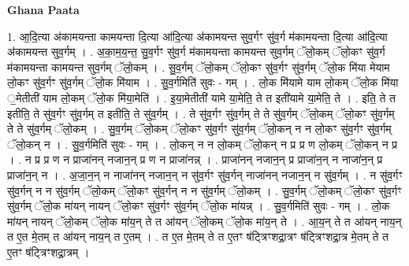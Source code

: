 \documentclass[17pt]{extarticle}
\begin{document}
\textbf{Ghana Paata } \newline

1. आ॒दि॒त्या अ॑कामयन्ता कामयन्ता दि॒त्या आ॑दि॒त्या अ॑कामयन्त सुव॒र्गꣳ सु॑व॒र्ग म॑कामयन्ता दि॒त्या आ॑दि॒त्या अ॑कामयन्त सुव॒र्गम् । . अ॒का॒म॒य॒न्त॒ सु॒व॒र्गꣳ सु॑व॒र्ग म॑कामयन्ता कामयन्त सुव॒र्गम् ॅलो॒कम् ॅलो॒कꣳ सु॑व॒र्ग म॑कामयन्ता कामयन्त सुव॒र्गम् ॅलो॒कम् । . सु॒व॒र्गम् ॅलो॒कम् ॅलो॒कꣳ सु॑व॒र्गꣳ सु॑व॒र्गम् ॅलो॒क मि॑या मेयाम लो॒कꣳ सु॑व॒र्गꣳ सु॑व॒र्गम् ॅलो॒क मि॑याम । . सु॒व॒र्गमिति॑ सुवः - गम् । . लो॒क मि॑यामे याम लो॒कम् ॅलो॒क मि॑या ॒मेतीती॑ याम लो॒कम् ॅलो॒क मि॑या॒मेति॑ । . इ॒या॒मेतीती॑ यामे या॒मेति॒ ते त इती॑यामे या॒मेति॒ ते । . इति॒ ते त इतीति॒ ते सु॑व॒र्गꣳ सु॑व॒र्गम् त इतीति॒ ते सु॑व॒र्गम् । . ते सु॑व॒र्गꣳ सु॑व॒र्गम् ते ते सु॑व॒र्गम् ॅलो॒कम् ॅलो॒कꣳ सु॑व॒र्गम् ते ते सु॑व॒र्गम् ॅलो॒कम् । . सु॒व॒र्गम् ॅलो॒कम् ॅलो॒कꣳ सु॑व॒र्गꣳ सु॑व॒र्गम् ॅलो॒कन् न न लो॒कꣳ सु॑व॒र्गꣳ सु॑व॒र्गम् ॅलो॒कन् न । . सु॒व॒र्गमिति॑ सुवः - गम् । . लो॒कन् न न लो॒कम् ॅलो॒कन् न प्र प्र ण लो॒कम् ॅलो॒कन् न प्र । . न प्र प्र ण न प्राजा॑नन् नजान॒न् प्र ण न प्राजा॑नन्न् । . प्राजा॑नन् नजान॒न् प्र प्राजा॑न॒न् न नाजा॑न॒न् प्र प्राजा॑न॒न् न । . अ॒जा॒न॒न् न नाजा॑नन् नजान॒न् न सु॑व॒र्गꣳ सु॑व॒र्गन् नाजा॑नन् नजान॒न् न सु॑व॒र्गम् । . न सु॑व॒र्गꣳ सु॑व॒र्गन् न न सु॑व॒र्गम् ॅलो॒कम् ॅलो॒कꣳ सु॑व॒र्गन् न न सु॑व॒र्गम् ॅलो॒कम् । . सु॒व॒र्गम् ॅलो॒कम् ॅलो॒कꣳ सु॑व॒र्गꣳ सु॑व॒र्गम् ॅलो॒क मा॑यन् नायन् ॅलो॒कꣳ सु॑व॒र्गꣳ सु॑व॒र्गम् ॅलो॒क मा॑यन्न् । . सु॒व॒र्गमिति॑ सुवः - गम् । . लो॒क मा॑यन् नायन् ॅलो॒कम् ॅलो॒क मा॑य॒न् ते त आ॑यन् ॅलो॒कम् ॅलो॒क मा॑य॒न् ते । . आ॒य॒न् ते त आ॑यन् नाय॒न् त ए॒त मे॒तम् त आ॑यन् नाय॒न् त ए॒तम् । . त ए॒त मे॒तम् ते त ए॒तꣳ ष॑ट्त्रिꣳशद्रा॒त्रꣳ ष॑ट्त्रिꣳशद्रा॒त्र मे॒तम् ते त ए॒तꣳ ष॑ट्त्रिꣳशद्रा॒त्रम् । \newline
\end{document}

